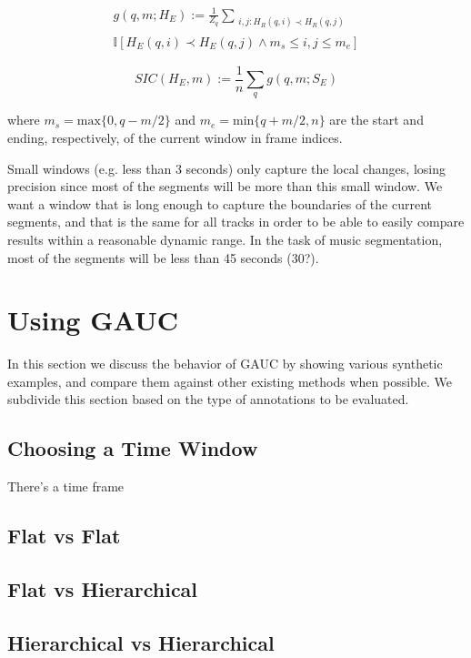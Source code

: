 \documentclass{article}
\begin{document}
\begin{multline}
  g(q, m ; H_E) := \frac{1}{Z_q} \sum_{\substack{i,j : H_R(q, i) \prec H_R(q, j) }} \\ \mathbb{I}\left[ H_E(q, i) \prec H_E(q, j) \land m_s \leq i,j \leq m_e\right]
\end{multline}

\begin{equation}
SIC(H_E,m) := \frac{1}{n} \sum_q g(q,m ; S_E)
\end{equation}

where $m_s = \mbox{max}\{0,q-m/2\}$ and $m_e = \mbox{min}\{q+m/2,n\}$ are the start and ending, respectively, of the current window in frame indices.

Small windows (e.g. less than 3 seconds) only capture the local changes, losing precision since most of the segments will be more than this small window.
We want a window that is long enough to capture the boundaries of the current segments, and that is the same for all tracks in order to be able to easily compare results within a reasonable dynamic range.
In the task of music segmentation, most of the segments will be less than 45 seconds (30?).

\section{Using GAUC}\label{sec:using_method}

In this section we discuss the behavior of GAUC by showing various synthetic examples, and compare them against other existing methods when possible.
We subdivide this section based on the type of annotations to be evaluated.

\subsection{Choosing a Time Window}

There's a time frame 


\subsection{Flat vs Flat}


\subsection{Flat vs Hierarchical}

\subsection{Hierarchical vs Hierarchical}
\end{document}
